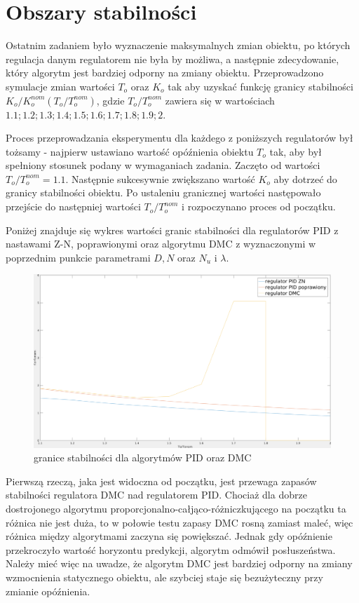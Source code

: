 \documentclass[fleqn]{article}
\begin{document}
	\section{Obszary stabilności}

Ostatnim zadaniem było wyznaczenie maksymalnych zmian obiektu, po których regulacja danym regulatorem nie była by możliwa, a następnie zdecydowanie, który algorytm jest bardziej odporny na zmiany obiektu. Przeprowadzono symulacje zmian wartości $T_o$ oraz $K_o$ tak aby uzyskać funkcję granicy stabilności $K_o/K_o^{nom}(T_o/T_o^{nom})$, gdzie $T_o/T_o^{nom}$ zawiera się w wartościach ${1.1;1.2;1.3;1.4;1.5;1.6;1.7;1.8;1.9;2}$.

Proces przeprowadzania eksperymentu dla każdego z poniższych regulatorów był tożsamy - najpierw ustawiano wartość opóźnienia obiektu $T_o$ tak, aby był spełniony stosunek podany w wymaganiach zadania. Zaczęto od wartości $T_o/T_o^{nom}=1.1$. Następnie sukcesywnie zwiększano wartość $K_o$ aby dotrzeć do granicy stabilności obiektu. Po ustaleniu granicznej wartości następowało przejście do następniej wartości $T_o/T_o^{nom}$ i rozpoczynano proces od początku.

Poniżej znajduje się wykres wartości granic stabilności dla regulatorów PID z nastawami Z-N, poprawionymi oraz algorytmu DMC z wyznaczonymi w poprzednim punkcie parametrami $D, N$ oraz $N_u$ i $\lambda$.

\begin{figure}[H]
	\includegraphics[width=\textwidth]{scripts/zad6.png}
	\caption{granice stabilności dla algorytmów PID oraz DMC}
\end{figure}

Pierwszą rzeczą, jaka jest widoczna od początku, jest przewaga zapasów stabilności regulatora DMC nad regulatorem PID. Chociaż dla dobrze dostrojonego algorytmu proporcjonalno-całjąco-różniczkującego na początku ta różnica nie jest duża, to w połowie testu zapasy DMC rosną zamiast maleć, więc różnica między algorytmami zaczyna się powiększać. Jednak gdy opóźnienie przekroczyło wartość  horyzontu predykcji, algorytm odmówił posłuszeństwa. Należy mieć więc na uwadze, że algorytm DMC jest bardziej odporny na zmiany wzmocnienia statycznego obiektu, ale szybciej staje się bezużyteczny przy zmianie opóźnienia.
\end{document}
